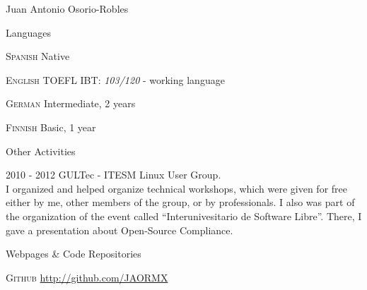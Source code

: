 \documentclass[english,10pt,letterpaper]{article}
\begin{document}
\begin{cv}{Juan Antonio Osorio-Robles}


	\begin{cvlist}{Languages}
		\item [\textsc {Spanish}]
				Native
		\item [\textsc {English}]
				TOEFL IBT: \emph{103/120} - working language
		\item [\textsc {German}]
				Intermediate, 2 years
		\item [\textsc {Finnish}]
				Basic, 1 year
		\end{cvlist}

	\begin{cvlist}{Other Activities}
		\item [2010 - 2012] GULTec - ITESM Linux User Group.\\
			I organized and helped organize technical workshops, which were
            given for free either by me, other members of the group, or by
            professionals. I also was part of the organization of the event
            called ``Interunivesitario de Software Libre''. There, I gave a
            presentation about Open-Source Compliance.
    \end{cvlist}

	\begin{cvlist}{Webpages \& Code Repositories}
        \item [\textsc{Github}]
            \href{http://github.com/JAORMX}{http://github.com/JAORMX}
	\end{cvlist}

\end{cv}
\end{document}
